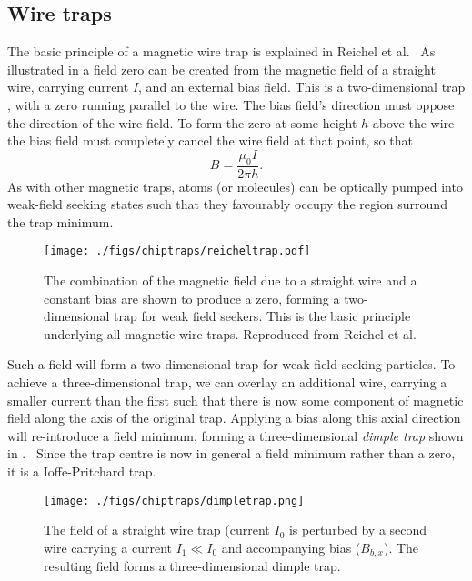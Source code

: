 \subsection{Wire traps}
\label{chiptraps:wiretraps}

The basic principle of a magnetic wire trap is explained in Reichel et
al.~\cite{Reichel1999} As illustrated in  a
field zero can be created from the magnetic field of a straight wire, carrying
current $I$, and an external bias field. This is a two-dimensional trap
, with a zero running parallel to the wire. The bias field's direction
must oppose the direction of the wire field. To form the zero at some height $h$
above the wire the bias field must completely cancel the wire field at that
point, so that 
%
\begin{equation}
  B = \frac{\mu_0 I}{2\pi h}.
\end{equation}
%
As with other magnetic traps, atoms (or molecules) can be optically pumped into
weak-field seeking states such that they favourably occupy the region surround
the trap minimum.~\cite{Metcalf1999}

\begin{figure}
  \texttt{[image: ./figs/chiptraps/reicheltrap.pdf]}
  \caption{The combination of the magnetic field due to a straight wire and a
  constant bias are shown to produce a zero, forming a two-dimensional trap for
  weak field seekers. This is the basic principle underlying all magnetic wire
  traps. Reproduced from Reichel et al.~\cite{Reichel1999}
  }
  \label{chiptraps:fig:reicheltrap}
\end{figure}

Such a field will form a two-dimensional trap for weak-field seeking particles.
To achieve a three-dimensional trap, we can overlay an additional wire,
carrying a smaller current than the first such that there is now some component
of magnetic field along the axis of the original trap. Applying a bias along
this axial direction will re-introduce a field minimum, forming a three-dimensional
\emph{dimple trap} shown in .~\cite{2011Ac}
Since the trap centre is now in general a field minimum rather than a
zero, it is a Ioffe-Pritchard trap.

\begin{figure}
  \texttt{[image: ./figs/chiptraps/dimpletrap.png]}
  \caption{The field of a straight wire trap (current $I_0$ is perturbed by a
  second wire carrying a current $I_1 \ll I_0 $ and accompanying bias
  ($B_{b,x}$). The resulting field forms a three-dimensional dimple trap.
  }
  \label{chiptraps:fig:dimpletrap}
\end{figure}


